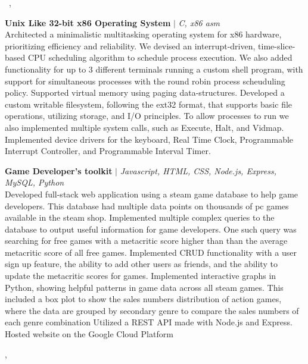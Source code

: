 \documentclass[12pt]{letter}
\begin{document}
\vspace{-0.1in}\greeting\ \recipient,\\

\vspace{-0.1in}\setlength\parindent{24pt}
\noindent

{\textbf{Unix Like 32-bit x86 Operating System} $|$ \emph{C, x86 asm}}{}
\\
Architected a minimalistic multitasking operating system for x86 hardware, prioritizing efficiency and reliability. We devised an interrupt-driven, time-slice-based CPU scheduling algorithm to schedule process execution. We also added functionality for up to 3 different terminals running a custom shell program, with support for simultaneous processes with the round robin process scheuduling policy.
Supported virtual memory using paging data-structures. Developed a custom writable filesystem, following the ext32 format, that supports basic file operations, utilizing storage, and I/O principles.
To allow processes to run we also implemented multiple system calls, such as Execute, Halt, and Vidmap. 
Implemented device drivers for the keyboard, Real Time Clock, Programmable Interrupt Controller, and Programmable Interval Timer.

{\textbf{Game Developer's toolkit} $|$ \emph{Javascript, HTML, CSS, Node.js, Express, MySQL, Python}}{}
\\
Developed full-stack web application using a steam game database to help game developers. This database had multiple data points on thousands of pc games available in the steam shop.
Implemented multiple complex queries to the database to output useful information for game developers. One such query was searching for free games with a metacritic score higher than than the average metacritic score of all free games. Implemented CRUD functionality with a user sign up feature, the ability to add other users as friends, and the ability to update the metacritic scores for games.  
Implemented interactive graphs in Python, showing helpful patterns in game data across all steam games. This included a box plot to show the sales numbers distribution of action games, where the data are grouped by secondary genre to compare the sales numbers of each genre combination
Utilized a REST API made with Node.js and Express. Hosted website on the Google Cloud Platform

\vspace{0.1in}
\vfill

\begin{flushright}
\closer,


\myname\\
\mytitle
\end{flushright}
\end{document}
